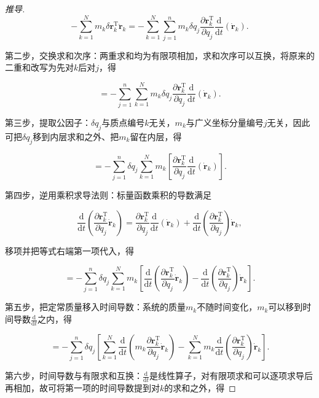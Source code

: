 \begin{proof}[推导]
\[
-\sum_{k=1}^{N} m_k \delta\boldsymbol{r}_k^{\mathrm{T}}\ddot{\boldsymbol{r}}_k
= -\sum_{k=1}^{N}\sum_{j=1}^{n} m_k \delta q_j \frac{\partial \boldsymbol{r}_k^{\mathrm{T}}}{\partial q_j} \frac{\mathrm{d}}{\mathrm{d}t}\left(\dot{\boldsymbol{r}}_k\right).
\]

第二步，交换求和次序：两重求和均为有限项相加，求和次序可以互换，将原来的二重和改写为先对$k$后对$j$，得

\[
= -\sum_{j=1}^{n}\sum_{k=1}^{N} m_k \delta q_j \frac{\partial \boldsymbol{r}_k^{\mathrm{T}}}{\partial q_j} \frac{\mathrm{d}}{\mathrm{d}t}\left(\dot{\boldsymbol{r}}_k\right).
\]

第三步，提取公因子：$\delta q_j$与质点编号$k$无关，$m_k$与广义坐标分量编号$j$无关，因此可把$\delta q_j$移到内层求和之外、把$m_k$留在内层，得

\[
= -\sum_{j=1}^{n} \delta q_j \sum_{k=1}^{N} m_k \left[ \frac{\partial \boldsymbol{r}_k^{\mathrm{T}}}{\partial q_j} \frac{\mathrm{d}}{\mathrm{d}t}\left(\dot{\boldsymbol{r}}_k\right) \right].
\]

第四步，逆用乘积求导法则：标量函数乘积的导数满足

\[
\frac{\mathrm{d}}{\mathrm{d}t}\left(\frac{\partial \boldsymbol{r}_k^{\mathrm{T}}}{\partial q_j}\dot{\boldsymbol{r}}_k\right)
= \frac{\partial \boldsymbol{r}_k^{\mathrm{T}}}{\partial q_j}\frac{\mathrm{d}}{\mathrm{d}t}\left(\dot{\boldsymbol{r}}_k\right) + \frac{\mathrm{d}}{\mathrm{d}t}\left(\frac{\partial \boldsymbol{r}_k^{\mathrm{T}}}{\partial q_j}\right)\dot{\boldsymbol{r}}_k,
\]

移项并把等式右端第一项代入，得

\[
= -\sum_{j=1}^{n} \delta q_j \sum_{k=1}^{N} m_k \left[ \frac{\mathrm{d}}{\mathrm{d}t}\left(\frac{\partial \boldsymbol{r}_k^{\mathrm{T}}}{\partial q_j}\dot{\boldsymbol{r}}_k\right) - \frac{\mathrm{d}}{\mathrm{d}t}\left(\frac{\partial \boldsymbol{r}_k^{\mathrm{T}}}{\partial q_j}\right)\dot{\boldsymbol{r}}_k \right].
\]

第五步，把定常质量移入时间导数：系统的质量$m_k$不随时间变化，$m_k$可以移到时间导数$\frac{\mathrm{d}}{\mathrm{d}t}$之内，得

\[
= -\sum_{j=1}^{n} \delta q_j \left[ \sum_{k=1}^{N} \frac{\mathrm{d}}{\mathrm{d}t}\left(m_k \frac{\partial \boldsymbol{r}_k^{\mathrm{T}}}{\partial q_j}\dot{\boldsymbol{r}}_k\right) - \sum_{k=1}^{N} m_k \frac{\mathrm{d}}{\mathrm{d}t}\left(\frac{\partial \boldsymbol{r}_k^{\mathrm{T}}}{\partial q_j}\right)\dot{\boldsymbol{r}}_k \right].
\]

第六步，时间导数与有限求和互换：$\frac{\mathrm{d}}{\mathrm{d}t}$是线性算子，对有限项求和可以逐项求导后再相加，故可将第一项的时间导数提到对$k$的求和之外，得


\end{proof}
